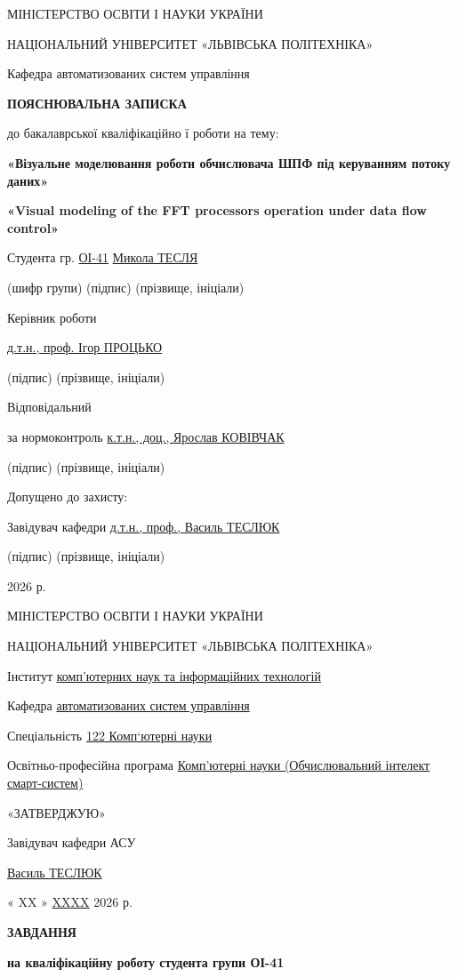 \usepackage{booktabs}
\usepackage{hyperref}
\usepackage{textcomp}
\usepackage{amsopn}
\usepackage{graphicx}МІНІСТЕРСТВО ОСВІТИ І НАУКИ УКРАЇНИ

НАЦІОНАЛЬНИЙ УНІВЕРСИТЕТ «ЛЬВІВСЬКА ПОЛІТЕХНІКА»

Кафедра автоматизованих систем управління

\textbf{ПОЯСНЮВАЛЬНА ЗАПИСКА}

до бакалаврської кваліфікаційно ї роботи на тему:

\textbf{«Візуальне моделювання роботи обчислювача ШПФ під керуванням
потоку даних»}

\textbf{«Visual modeling of the FFT processor\textquotesingle s
operation under data flow control»}

Студента гр. \ul{ОІ-41} \ul{Микола ТЕСЛЯ}

(шифр групи) (підпис) (прізвище, ініціали)

Керівник роботи

\ul{д.т.н., проф. Ігор ПРОЦЬКО}

(підпис) (прізвище, ініціали)

Відповідальний

за нормоконтроль \ul{к.т.н., доц., Ярослав КОВІВЧАК}

(підпис) (прізвище, ініціали)

Допущено до захисту:

Завідувач кафедри \ul{д.т.н., проф., Василь ТЕСЛЮК}

(підпис) (прізвище, ініціали)

2026 р.

МІНІСТЕРСТВО ОСВІТИ І НАУКИ УКРАЇНИ

НАЦІОНАЛЬНИЙ УНІВЕРСИТЕТ «ЛЬВІВСЬКА ПОЛІТЕХНІКА»

Інститут \ul{комп'ютерних наук та інформаційних технологій}

Кафедра \ul{автоматизованих систем управління}

Спеціальність \ul{122 Комп`ютерні науки}

Освітньо-професійна програма \ul{Комп'ютерні науки (Обчислювальний
інтелект смарт-систем)}

«ЗАТВЕРДЖУЮ»

Завідувач кафедри АСУ

\ul{Василь ТЕСЛЮК}

« XX » \ul{XXXX} 2026 р.

\textbf{ЗАВДАННЯ}

\textbf{на кваліфікаційну роботу студента групи ОІ-41}

